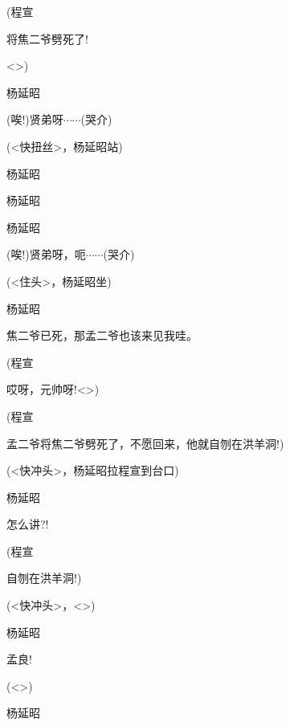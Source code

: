 {(程宣\hspace{30pt}~

将焦二爷劈死了!

\textless{}\!\textgreater{})

杨延昭\hspace{20pt}~

(唉!)贤弟呀$\cdots{}\cdots{}$(哭介)

({\textless{}快扭丝\textgreater{}}，杨延昭站)

杨延昭


杨延昭\hspace{20pt}~


杨延昭\hspace{20pt}~

(唉!)贤弟呀，呃$\cdots{}\cdots{}$(哭介)

({\textless{}住头\textgreater{}}，杨延昭坐)

杨延昭\hspace{20pt}~

焦二爷已死，那孟二爷也该来见我哇。

(程宣\hspace{30pt}~

哎呀，元帅呀!\textless{}\!\textgreater{})

(程宣\hspace{30pt}~

孟二爷将焦二爷劈死了，不愿回来，他就自刎在洪羊洞!)

({\textless{}快冲头\textgreater{}}，杨延昭拉程宣到台口)

杨延昭\hspace{20pt}~

怎么讲?!

(程宣\hspace{30pt}~

自刎在洪羊洞!)

({\textless{}快冲头\textgreater{}，}\textless{}\!\textgreater{})

杨延昭\hspace{20pt}~

孟良!

(\textless{}\!\textgreater{})

杨延昭\hspace{20pt}~

}
